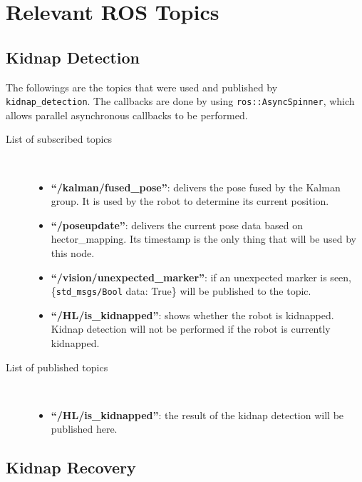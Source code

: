 


\section{Relevant ROS Topics}\label{section:relevant_ros_topics}

\subsection{Kidnap Detection}
The followings are the topics that were used and published by \texttt{kidnap\_detection}. The callbacks are done by using \texttt{ros::AsyncSpinner}, which allows parallel asynchronous callbacks to be performed.


\begin{description}
\item[List of subscribed topics]\
	\begin{itemize}
	\item  \textbf{``/kalman/fused\_pose''}: delivers the pose fused by the Kalman group. It is used by the robot to determine its current position.
	\item  \textbf{``/poseupdate''}: delivers the current pose data based on hector\_mapping. Its timestamp is the only thing that will be used by this node.
	\item  \textbf{``/vision/unexpected\_marker''}: if an unexpected marker is seen, \{\texttt{std\_msgs/Bool} data: True\} will be published to the topic.
	\item  \textbf{``/HL/is\_kidnapped''}: shows whether the robot is kidnapped. Kidnap detection will not be performed if the robot is currently kidnapped.
	\end{itemize}
\end{description}

\begin{description}
\item[List of published topics]\
	\begin{itemize}
	\item \textbf{``/HL/is\_kidnapped''}: the result of the kidnap detection will be published here.
	\end{itemize}
\end{description}

\subsection{Kidnap Recovery}

